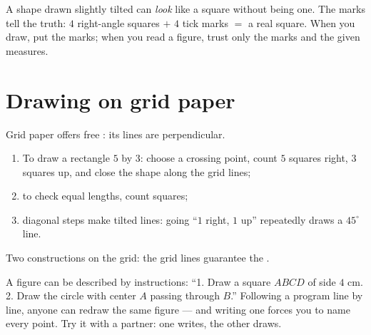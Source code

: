 \begin{example}\label{ex:g3:shapes:marks}
A shape drawn slightly tilted can \emph{look} like a square without
being one. The marks tell the truth: $4$ right-angle squares $+$ $4$
tick marks $=$ a real square. When you draw, put the marks; when you
read a figure, trust only the marks and the given measures.
\end{example}

\section{Drawing on grid paper}

\begin{method}\label{met:g3:shapes:grid}
Grid paper offers free : its lines are perpendicular.
\begin{enumerate}
  \item To draw a rectangle $5$ by $3$: choose a crossing point,
        count $5$ squares right, $3$ squares up, and close the shape
        along the grid lines;
  \item to check equal lengths, count squares;
  \item diagonal steps make tilted lines: going ``$1$ right, $1$ up''
        repeatedly draws a $45^\circ$ line.
\end{enumerate}
\end{method}

\begin{omfigure}

{\small Two constructions on the grid: the grid lines guarantee the
.}
\end{omfigure}

\begin{example}\label{ex:g3:shapes:program}
A figure can be described by instructions:
``1. Draw a square $ABCD$ of side $4$ cm. 2. Draw the circle with
center $A$ passing through $B$.'' Following a program line by line,
anyone can redraw the same figure --- and writing one forces you to
name every point. Try it with a partner: one writes, the other
draws.
\end{example}

